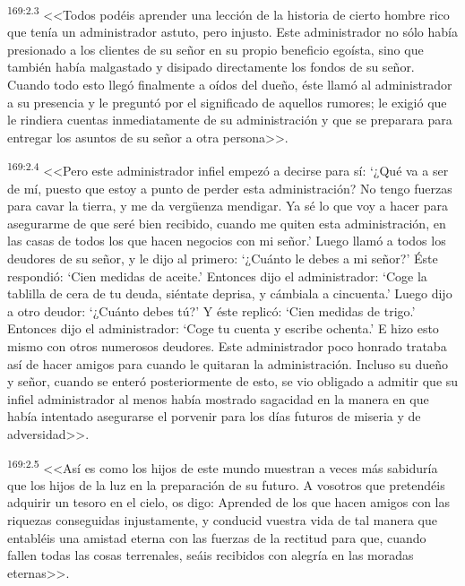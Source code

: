 \par 
\textsuperscript{169:2.3} <<Todos podéis aprender una lección de la historia de cierto hombre rico que tenía un administrador astuto, pero injusto. Este administrador no sólo había presionado a los clientes de su señor en su propio beneficio egoísta, sino que también había malgastado y disipado directamente los fondos de su señor. Cuando todo esto llegó finalmente a oídos del dueño, éste llamó al administrador a su presencia y le preguntó por el significado de aquellos rumores; le exigió que le rindiera cuentas inmediatamente de su administración y que se preparara para entregar los asuntos de su señor a otra persona>>.

\par 
\textsuperscript{169:2.4} <<Pero este administrador infiel empezó a decirse para sí: `¿Qué va a ser de mí, puesto que estoy a punto de perder esta administración? No tengo fuerzas para cavar la tierra, y me da verg\"uenza mendigar. Ya sé lo que voy a hacer para asegurarme de que seré bien recibido, cuando me quiten esta administración, en las casas de todos los que hacen negocios con mi señor.' Luego llamó a todos los deudores de su señor, y le dijo al primero: `¿Cuánto le debes a mi señor?' Éste respondió: `Cien medidas de aceite.' Entonces dijo el administrador: `Coge la tablilla de cera de tu deuda, siéntate deprisa, y cámbiala a cincuenta.' Luego dijo a otro deudor: `¿Cuánto debes tú?' Y éste replicó: `Cien medidas de trigo.' Entonces dijo el administrador: `Coge tu cuenta y escribe ochenta.' E hizo esto mismo con otros numerosos deudores. Este administrador poco honrado trataba así de hacer amigos para cuando le quitaran la administración. Incluso su dueño y señor, cuando se enteró posteriormente de esto, se vio obligado a admitir que su infiel administrador al menos había mostrado sagacidad en la manera en que había intentado asegurarse el porvenir para los días futuros de miseria y de adversidad>>.

\par 
\textsuperscript{169:2.5} <<Así es como los hijos de este mundo muestran a veces más sabiduría que los hijos de la luz en la preparación de su futuro. A vosotros que pretendéis adquirir un tesoro en el cielo, os digo: Aprended de los que hacen amigos con las riquezas conseguidas injustamente, y conducid vuestra vida de tal manera que entabléis una amistad eterna con las fuerzas de la rectitud para que, cuando fallen todas las cosas terrenales, seáis recibidos con alegría en las moradas eternas>>.

